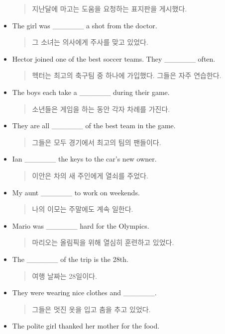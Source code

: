 \documentclass{article}
\begin{document}
\begin{addmargin}[1em]{1em}
\begin{itemize}
    \begin{quote}
    지난달에 마고는 도움을 요청하는 표지판을 게시했다.
    \end{quote}
    \item The girl was \_\_\_\_\_\_ a shot from the doctor.
    \begin{quote}
    그 소녀는 의사에게 주사를 맞고 있었다.
    \end{quote}
    \item Hector joined one of the best soccer teams. They \_\_\_\_\_\_ often.
    \begin{quote}
    헥터는 최고의 축구팀 중 하나에 가입했다. 그들은 자주 연습한다.
    \end{quote}
    \item The boys each take a \_\_\_\_\_\_ during their game.
    \begin{quote}
    소년들은 게임을 하는 동안 각자 차례를 가진다.
    \end{quote}
    \item They are all \_\_\_\_\_\_ of the best team in the game.
    \begin{quote}
    그들은 모두 경기에서 최고의 팀의 팬들이다.
    \end{quote}
    \newpage
    \item Ian \_\_\_\_\_\_ the keys to the car's new owner.
    \begin{quote}
    이안은 차의 새 주인에게 열쇠를 주었다.
    \end{quote}
    \item My aunt \_\_\_\_\_\_ to work on weekends.
    \begin{quote}
    나의 이모는 주말에도 계속 일한다.
    \end{quote}
    \item Mario was \_\_\_\_\_\_ hard for the Olympics.
    \begin{quote}
    마리오는 올림픽을 위해 열심히 훈련하고 있었다.
    \end{quote}
    \item The \_\_\_\_\_\_ of the trip is the 28th.
    \begin{quote}
    여행 날짜는 28일이다.
    \end{quote}
    \item They were wearing nice clothes and \_\_\_\_\_\_.
    \begin{quote}
    그들은 멋진 옷을 입고 춤을 추고 있었다.
    \end{quote}
    \item The polite girl thanked her mother for the food.

\end{itemize}
\end{addmargin}
\end{document}
